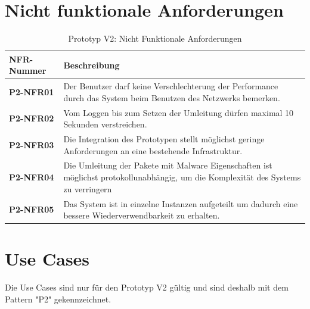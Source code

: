 \begin{table}[H]
	\section{Nicht funktionale Anforderungen}
    \centering
	\begin{tabularx}{\textwidth}{| l | X |}
        \hline
        \textbf{NFR-Nummer} & \textbf{Beschreibung} \\ \hline
        \textbf{P2-NFR01} & Der Benutzer darf keine Verschlechterung der Performance durch das System beim Benutzen des Netzwerks bemerken. \\\hline        
        \textbf{P2-NFR02} & Vom Loggen bis zum Setzen der Umleitung dürfen maximal 10 Sekunden verstreichen.\\ \hline
        \textbf{P2-NFR03} & Die Integration des Prototypen stellt möglichst geringe Anforderungen an eine bestehende Infrastruktur. \\ \hline
        \textbf{P2-NFR04} & Die Umleitung der Pakete mit Malware Eigenschaften ist möglichst protokollunabhängig, um die Komplexität des Systems zu verringern\\ \hline
        \textbf{P2-NFR05} & Das System ist in einzelne Instanzen aufgeteilt um dadurch eine bessere Wiederverwendbarkeit zu erhalten.\\ \hline
    \end{tabularx}
    \caption{Prototyp V2: Nicht Funktionale Anforderungen}
\end{table}

\newpage
\section{Use Cases}
Die Use Cases sind nur für den Prototyp V2 gültig und sind deshalb mit dem Pattern "P2" gekennzeichnet.



